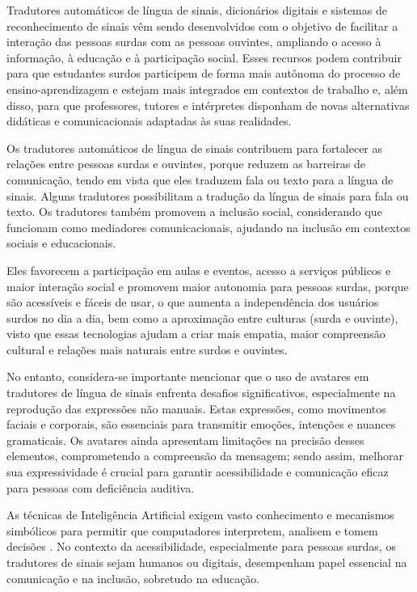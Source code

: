 \documentclass[portuguese]{textolivre}
\begin{document}
Tradutores automáticos de língua de sinais, dicionários digitais e sistemas de reconhecimento de sinais vêm sendo desenvolvidos com o objetivo de facilitar a interação das pessoas surdas com as pessoas ouvintes, ampliando o acesso à informação, à educação e à participação social. Esses recursos podem contribuir para que estudantes surdos participem de forma mais autônoma do processo de ensino-aprendizagem e estejam mais integrados em contextos de trabalho e, além disso, para que professores, tutores e intérpretes disponham de novas alternativas didáticas e comunicacionais adaptadas às suas realidades.

Os tradutores automáticos de língua de sinais contribuem para fortalecer as relações entre pessoas surdas e ouvintes, porque reduzem as barreiras de comunicação, tendo em vista que eles traduzem fala ou texto para a língua de sinais. Alguns tradutores possibilitam a tradução da língua de sinais para fala ou texto. Os tradutores também promovem a inclusão social, considerando que funcionam como mediadores comunicacionais, ajudando na inclusão em contextos sociais e educacionais. 

Eles favorecem a participação em aulas e eventos, acesso a serviços públicos e maior interação social e promovem maior autonomia para pessoas surdas, porque são acessíveis e fáceis de usar, o que aumenta a independência dos usuários surdos no dia a dia, bem como a aproximação entre culturas (surda e ouvinte), visto que essas tecnologias ajudam a criar mais empatia, maior compreensão cultural e relações mais naturais entre surdos e ouvintes.

No entanto, considera-se importante mencionar que o uso de avatares em tradutores de língua de sinais enfrenta desafios significativos, especialmente na reprodução das expressões não manuais. Estas expressões, como movimentos faciais e corporais, são essenciais para transmitir emoções, intenções e nuances gramaticais. Os avatares ainda apresentam limitações na precisão desses elementos, comprometendo a compreensão da mensagem; sendo assim, melhorar sua expressividade é crucial para garantir acessibilidade e comunicação eficaz para pessoas com deficiência auditiva.

As técnicas de Inteligência Artificial exigem vasto conhecimento e mecanismos simbólicos para permitir que computadores interpretem, analisem e tomem decisões \cite{Santos2018}. No contexto da acessibilidade, especialmente para pessoas surdas, os tradutores de sinais sejam humanos ou digitais, desempenham papel essencial na comunicação e na inclusão, sobretudo na educação.
\end{document}
